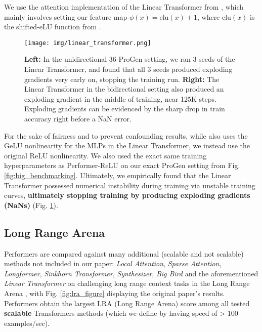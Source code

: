 We use the attention implementation of the Linear Transformer from \citep{trans-rnns}, which mainly involves setting our feature map $\phi(x) = \text{elu}(x) + 1$, where $\text{elu}(x)$ is the shifted-eLU function from \citep{elu}. 

\begin{figure}[h]
  \centering
  \texttt{[image: img/linear\_transformer.png]}
  \caption{\textbf{Left:} In the unidirectional 36-ProGen setting, we ran 3 seeds of the Linear Transformer, and found that all 3 seeds produced exploding gradients very early on, stopping the training run. \textbf{Right:} The Linear Transformer in the bidirectional setting also produced an exploding gradient in the middle of training, near 125K steps. Exploding gradients can be evidenced by the sharp drop in train accuracy right before a NaN error.}
  \label{fig:linear_transformer}
\end{figure}

For the sake of fairness and to prevent confounding results, while \citep{trans-rnns} also uses the GeLU nonlinearity for the MLPs in the Linear Transformer, we instead use the original ReLU nonlinearity. We also used the exact same training hyperparameters as Performer-ReLU on our exact ProGen setting from Fig. \ref{fig:big_benchmarking}. Ultimately, we empirically found that the Linear Transformer possessed numerical instability during training via unstable training curves, \textbf{ultimately stopping training by producing exploding gradients (NaNs)} (Fig. \ref{fig:linear_transformer}).

\subsection{Long Range Arena}
Performers are compared against many additional (scalable and not scalable) methods not included in our paper: \textit{Local Attention}, \textit{Sparse Attention}, \textit{Longformer}, \textit{Sinkhorn Transformer}, \textit{Synthesizer}, \textit{Big Bird} and the aforementioned \textit{Linear Transformer} on challenging long range context tasks in the Long Range Arena \citep{lra}, with Fig. \ref{fig:lra_figure} displaying the original paper's results. Performers obtain the largest LRA (Long Range Arena) score among all tested \textbf{scalable} Transformers methods (which we define by having speed of > 100 examples/sec). 

